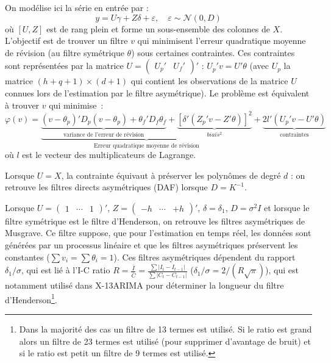 \documentclass[
  12pt,
  french,
  12pt,a4paper]{article}
\newcommand\1{\mathds{1}}
\begin{document}
On modélise ici la série en entrée par :
\begin{equation}
y=U\gamma+Z\delta+\varepsilon,\quad
\varepsilon\sim\mathcal{N}(0,D)
\label{eq:lpgeneralmodel}
\end{equation}
où \([U,Z]\) est de rang plein et forme un sous-ensemble des colonnes de \(X\).
L'objectif est de trouver un filtre \(v\) qui minimisent l'erreur quadratique moyenne de révision (au filtre symétrique \(\theta\)) sous certaines contraintes.
Ces contraintes sont représentées par la matrice \(U=\begin{pmatrix}U_{p}'&U_{f}'\end{pmatrix}'\) : \(U_p'v=U'\theta\) (avec \(U_p\) la matrice \((h+q+1)\times (d+1)\) qui contient les observations de la matrice \(U\) connues lors de l'estimation par le filtre asymétrique).
Le problème est équivalent à trouver \(v\) qui minimise~:
\begin{equation}
\varphi(v)=
\underbrace{
  \underbrace{(v-\theta_{p})'D_{p}(v-\theta_{p})+
  \theta_{f}'D_{f}\theta_{f}}_\text{variance de l'erreur de révision}+
  \underbrace{[\delta'(Z_{p}'v-Z'\theta)]^{2}}_{biais^2}
}_\text{Erreur quadratique moyenne de révision}+
\underbrace{2l'(U_{p}'v-U'\theta)}_{\text{contraintes}}
\label{eq:lppasym}
\end{equation}
où \(l\) est le vecteur des multiplicateurs de Lagrange.

Lorsque \(U=X\), la contrainte équivaut à préserver les polynômes de degré \(d\) : on retrouve les filtres directs asymétriques (DAF) lorsque \(D=K^{-1}\).

Lorsque \(U=\begin{pmatrix}1&\cdots&1\end{pmatrix}'\), \(Z=\begin{pmatrix}-h&\cdots&+h\end{pmatrix}'\), \(\delta=\delta_1\), \(D=\sigma^2I\) et lorsque le filtre symétrique est le filtre d'Henderson, on retrouve les filtres asymétriques de Musgrave.
Ce filtre suppose, que pour l'estimation en temps réel, les données sont générées par un processus linéaire et que les filtres asymétriques préservent les constantes (\(\sum v_i=\sum \theta_i=1\)).
Ces filtres asymétriques dépendent du rapport \(\delta_1/\sigma\), qui est lié à l'I-C ratio \(R=\frac{\bar{I}}{\bar{C}}=\frac{\sum\lvert I_t-I_{t-1}\rvert}{\sum\lvert C_t-C_{t-1}\rvert}\) (\(\delta_1/\sigma=2/(R\sqrt{\pi})\)), qui est notamment utilisé dans X-13ARIMA pour déterminer la longueur du filtre d'Henderson\footnote{
  Dans la majorité des cas un filtre de 13 termes est utilisé.
  Si le ratio est grand alors un filtre de 23 termes est utilisé (pour supprimer d'avantage de bruit) et si le ratio est petit un filtre de 9 termes est utilisé.}.
\end{document}
